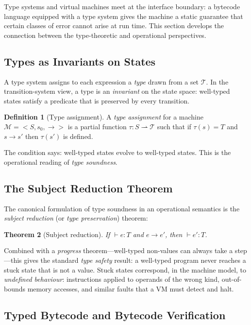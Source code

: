 \documentclass[11pt, a4paper]{article}
\theoremstyle{definition}
\newtheorem{definition}{Definition}[section]
\theoremstyle{plain}
\newtheorem{theorem}[definition]{Theorem}
\theoremstyle{remark}
\begin{document}
Type systems and virtual machines meet at the interface boundary: a bytecode
language equipped with a type system gives the machine a static guarantee
that certain classes of error cannot arise at run time. This section
develops the connection between the type-theoretic and operational
perspectives.

\subsection{Types as Invariants on States}

A type system assigns to each expression a \emph{type} drawn from a set
$\mathcal{T}$. In the transition-system view, a type is an \emph{invariant}
on the state space: well-typed states satisfy a predicate that is preserved
by every transition.

\begin{definition}[Type assignment]
  A \emph{type assignment} for a machine $\mathcal{M} = <S, s_0, \to>$ is a
  partial function $\tau : S \rightharpoonup \mathcal{T}$ such that if
  $\tau(s) = T$ and $s \to s'$ then $\tau(s')$ is defined.
\end{definition}

The condition says: well-typed states evolve to well-typed states. This is
the operational reading of \emph{type soundness}.

\subsection{The Subject Reduction Theorem}

The canonical formulation of type soundness in an operational semantics is
the \emph{subject reduction} (or \emph{type preservation}) theorem:

\begin{theorem}[Subject reduction]
  If $\vdash e : T$ and $e \to e'$, then $\vdash e' : T$.
\end{theorem}

Combined with a \emph{progress} theorem---well-typed non-values can always
take a step---this gives the standard \emph{type safety} result: a
well-typed program never reaches a stuck state that is not a value.
Stuck states correspond, in the machine model, to \emph{undefined behaviour}:
instructions applied to operands of the wrong kind, out-of-bounds memory
accesses, and similar faults that a VM must detect and halt.

\subsection{Typed Bytecode and Bytecode Verification}
\end{document}
